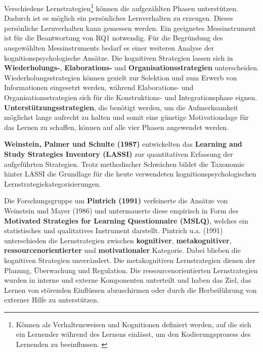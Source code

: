         Verschiedene Lernstrategien\footnote{ Können als Verhaltensweisen und Kognitionen definiert werden, auf die sich ein Lernender während des Lernens einlässt, um den Kodierungsprozess des Lernenden zu beeinflussen. \parencite[315]{Weinstein.1986}}
        können die aufgezählten Phasen unterstützen. Dadurch ist es möglich ein persönliches Lernverhalten zu erzeugen. Dieses persönliche 
        Lernverhalten kann gemessen werden. 
        Ein geeignetes Messinstrument ist für die Beantwortung von RQ1 notwendig. Für die Begründung des ausgewählten Messinstruments bedarf es einer weiteren Analyse der kognitionspsychologische Ansätze.
        Die kognitiven Strategien lassen sich in \textbf{Wiederholungs-}, \textbf{Elaborations-} und \textbf{Organisationsstrategien} unterscheiden.
        Wiederholungsstrategien können gezielt zur Selektion und zum Erwerb von Informationen eingesetzt werden,
        während Elaborations- und Organisationsstrategien sich für die Konstruktions- und Integrationsphase eignen. 
        \textbf{Unterstützungsstrategien}, die benötigt werden, um die Aufmerksamkeit möglichst lange aufrecht zu halten
        und somit eine günstige Motivationslage für das Lernen zu schaffen, können auf alle vier Phasen angewendet werden. \parencite[317]{Weinstein.1986} \parencite[17]{Thielke.2003}

        \textbf{Weinstein, Palmer und Schulte (1987)} entwickelten das \textbf{\glqq Learning and Study Strategies Inventory\grqq{} (LASSI)}
        zur quantitativen Erfassung der aufgeführten Strategien. \parencite{WeinsteinPalmerSchulte.1987}
        Trotz methodischer Schwächen bildet die Taxonomie hinter LASSI die Grundlage für die heute verwendeten kognitionspsychologischen
        Lernstrategiekategorisierungen. \parencite[11]{Martin.2012}

        Die Forschungsgruppe um \textbf{Pintrich (1991)} verfeinerte die Ansätze von Weinstein und Mayer (1986) und untermauerte diese empirisch in Form des \textbf{\glqq Motivated Strategies for Learning Questionnaire\grqq{} (MSLQ)}, welches ein statistisches und qualitatives Instrument darstellt. Pintrich u.a. (1991) unterschieden die Lernstrategien zwischen \textbf{kognitiver}, \textbf{metakognitiver}, \textbf{ressourcenorientierter} und 
        \textbf{motivationaler} Kategorie. 
        Dabei blieben die kognitiven Strategien unverändert.
        Die metakognitiven Lernstrategien dienen der Planung, Überwachung und Regulation. 
        Die ressourcenorientierten Lernstrategien wurden in interne und externe Komponenten unterteilt und haben das Ziel, das Lernen von störenden Einflüssen abzuschirmen oder durch die Herbeiführung von externer Hilfe zu unterstützen. \parencite[12]{Martin.2012}\parencite[370]{Cress.2006} \nocite{Pintrich.1991}
        
